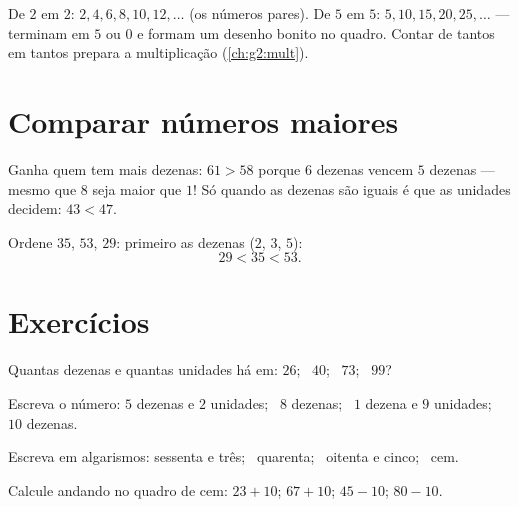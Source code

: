 \begin{example}[Contar de 2 em 2 e de 5 em 5]\label{ex:g1:tens:skip}
De $2$ em $2$: $2, 4, 6, 8, 10, 12, \dots$ (os números pares). De
$5$ em $5$: $5, 10, 15, 20, 25, \dots$ --- terminam em $5$ ou $0$ e
formam um desenho bonito no quadro. Contar de tantos em tantos
prepara a multiplicação (\cref{ch:g2:mult}).
\end{example}

\section{Comparar números maiores}

\begin{method}\label{met:g1:tens:compare}
Ganha quem tem mais dezenas: $61 > 58$ porque $6$ dezenas vencem $5$
dezenas --- mesmo que $8$ seja maior que $1$! Só quando as dezenas
são iguais é que as unidades decidem: $43 < 47$.
\end{method}

\begin{example}\label{ex:g1:tens:compare}
Ordene $35$, $53$, $29$: primeiro as dezenas ($2$, $3$, $5$):
\[
29 < 35 < 53 .
\]
\end{example}

\section{Exercícios}

\begin{exercise}[$\star$]\label{exo:g1:tens:1}
Quantas dezenas e quantas unidades há em: $26$; \ $40$; \ $73$; \
$99$?
\end{exercise}

\begin{exercise}[$\star$]\label{exo:g1:tens:2}
Escreva o número: $5$ dezenas e $2$ unidades; \ $8$ dezenas; \ $1$
dezena e $9$ unidades; \ $10$ dezenas.
\end{exercise}

\begin{exercise}[$\star$]\label{exo:g1:tens:3}
Escreva em algarismos: sessenta e três; \ quarenta; \ oitenta e
cinco; \ cem.
\end{exercise}

\begin{exercise}[$\star$]\label{exo:g1:tens:4}
Calcule andando no quadro de cem: $23 + 10$; \quad $67 + 10$;
\quad $45 - 10$; \quad $80 - 10$.
\end{exercise}

